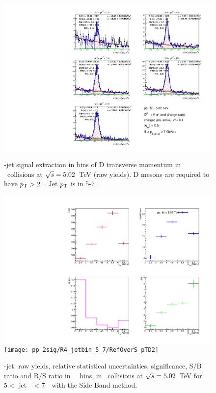 \begin{figure}[bth]
\centering
\begin{minipage}{.65\textwidth}
  \centering
\includegraphics[width=\textwidth]{pp_2sig/R4_jetbin_5_7/invMass_pTD2}
\caption{\Dzero-jet signal extraction in bins of D transverse momentum in \pp\ collisions at $\sqrt{s}=5.02$~TeV (raw yields). D mesons are required to have $p_{\rm T}>2$~\GeVc. Jet $p_{\rm T}$ is in 5-7 \GeVc.
}
\label{fig:eq_pp_InvMass_Dzero_5_7_R4}
\end{minipage}%
\begin{minipage}{.4\textwidth}
  \centering
  \includegraphics[width=\textwidth]{pp_2sig/R4_jetbin_5_7/signalParams_pTD2}
  \texttt{[image: pp\_2sig/R4\_jetbin\_5\_7/RefOverS\_pTD2]}
\caption{%
\Dzero-jet: raw yields, relative statistical uncertainties, significance, S/B ratio and R/S ratio in \Dzero\ \pt\ bins, in \pp\ collisions at $\sqrt{s}=5.02$~TeV for $5<$ jet \pt\ $<7$~\GeVc\ with the Side Band method.
}
\label{fig:eq_pp_signalParams_5_7_R4}
\end{minipage}
\end{figure}
